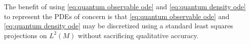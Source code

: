 \documentclass[final,leqno]{siamart}
\begin{document}
The benefit of using \eqref{eq:quantum observable ode} and \eqref{eq:quantum density ode} to represent the PDEs of concern is that \eqref{eq:quantum observable ode} and \eqref{eq:quantum density ode} may be discretized using a standard least squares projections on $L^{2}(M)$ without sacrificing qualitative accuracy.

%
%
\end{document}
